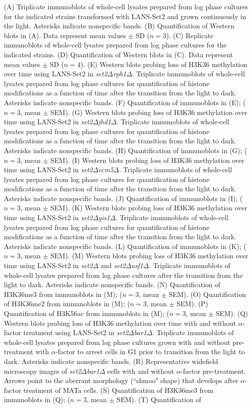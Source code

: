 \documentclass[11pt]{biorxiv}
\newcommand{\setdelt}{\emph{set2$\Delta$}\xspace}
\newcommand{\setdeltbardelt}{\emph{set2$\Delta$bar1$\Delta$}\xspace}
\newcommand{\setdeltasfdelt}{\emph{set2$\Delta$asf1$\Delta$}\xspace}
\newcommand{\setdeltrphdelt}{\emph{set2$\Delta$rph1$\Delta$}\xspace}
\newcommand{\setdeltgisdelt}{\emph{set2$\Delta$gis1$\Delta$}\xspace}
\newcommand{\setdeltjhddelt}{\emph{set2$\Delta$jhd1$\Delta$}\xspace}
\newcommand{\setdeltecmdelt}{\emph{set2$\Delta$ecm5$\Delta$}\xspace}
\begin{document}
\noindent (A) Triplicate immunoblots of whole-cell lysates prepared from log phase cultures for the indicated strains transformed with LANS-Set2 and grown continuously in the light. Asterisks indicate nonspecific bands. (B) Quantification of Western blots in (A). Data represent mean values $\pm$ SD ($n = 3$). (C) Replicate immunoblots of whole-cell lysates prepared from log phase cultures for the indicated strains. (D) Quantification of Western blots in (C). Data represent mean values $\pm$ SD ($n = 4$). (E) Western blots probing loss of H3K36 methylation over time using LANS-Set2 in \setdeltrphdelt. Triplicate immunoblots of whole-cell lysates prepared from log phase cultures for quantification of histone modifications as a function of time after the transition from the light to dark. Asterisks indicate nonspecific bands. (F) Quantification of immunoblots in (E); ($n = 3$, mean $\pm$ SEM). (G) Western blots probing loss of H3K36 methylation over time using LANS-Set2 in \setdeltjhddelt. Triplicate immunoblots of whole-cell lysates prepared from log phase cultures for quantification of histone modifications as a function of time after the transition from the light to dark. Asterisks indicate nonspecific bands. (H) Quantification of immunoblots in (G); ($n = 3$, mean $\pm$ SEM). (I) Western blots probing loss of H3K36 methylation over time using LANS-Set2 in \setdeltecmdelt. Triplicate immunoblots of whole-cell lysates prepared from log phase cultures for quantification of histone modifications as a function of time after the transition from the light to dark. Asterisks indicate nonspecific bands. (J) Quantification of immunoblots in (I); ($n = 3$, mean $\pm$ SEM). (K) Western blots probing loss of H3K36 methylation over time using LANS-Set2 in \setdeltgisdelt. Triplicate immunoblots of whole-cell lysates prepared from log phase cultures for quantification of histone modifications as a function of time after the transition from the light to dark. Asterisks indicate nonspecific bands. (L) Quantification of immunoblots in (K); ($n = 3$, mean $\pm$ SEM). (M) Western blots probing loss of H3K36 methylation over time using LANS-Set2 in \setdelt and \setdeltasfdelt. Triplicate immunoblots of whole-cell lysates prepared from log phase cultures after the transition from the light to dark. Asterisks indicate nonspecific bands. (N) Quantification of H3K36me3 from immunoblots in (M); ($n = 3$, mean $\pm$ SEM). (O) Quantification of H3K36me2 from immunoblots in (M); ($n = 3$, mean $\pm$ SEM). (P) Quantification of H3K56ac from immunoblots in (M); ($n = 3$, mean $\pm$ SEM). (Q) Western blots probing loss of H3K36 methylation over time with and without $\alpha$-factor treatment using LANS-Set2 in \setdeltbardelt. Triplicate immunoblots of whole-cell lysates prepared from log phase cultures grown with and without pre-treatment with $\alpha$-factor to arrest cells in G1 prior to transition from the light to dark. Asterisks indicate nonspecific bands. (R) Representative widefield microscopy images of \setdeltbardelt cells with and without $\alpha$-factor pre-treatment. Arrows point to the aberrant morphology (``shmoo" shape) that develops after $\alpha$-factor treatment of MATa cells. (S) Quantification of H3K36me3 from immunoblots in (Q); ($n = 3$, mean $\pm$ SEM). (T) Quantification of 
\end{document}
